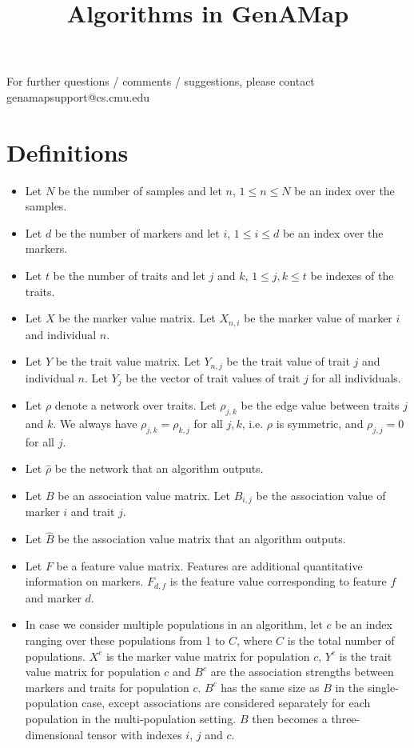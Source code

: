 \documentclass{article}
\title{Algorithms in GenAMap}
\author{}
\date{}
\begin{document}
\maketitle


\begin{raggedright}
For further questions / comments / suggestions, please contact genamapsupport@cs.cmu.edu

\end{raggedright}


\section{Definitions}

\begin{itemize}
\item Let $N$ be the number of samples and let $n$, $1 \le n \le N$ be an index over the samples.
\item Let $d$ be the number of markers and let $i$, $1 \le i \le d$ be an index over the markers.
\item Let $t$ be the number of traits and let $j$ and $k$, $1 \le j,k \le t$ be indexes of the traits.
\item Let $X$ be the marker value matrix. Let $X_{n,i}$ be the marker value of marker $i$ and individual $n$. 
\item Let $Y$ be the trait value matrix. Let $Y_{n,j}$ be the trait value of trait $j$ and individual $n$. Let $Y_j$ be the vector of trait values of trait $j$ for all individuals.
\item Let $\rho$ denote a network over traits. Let $\rho_{j,k}$ be the edge value between traits $j$ and $k$. We always have $\rho_{j,k} = \rho_{k,j}$ for all $j,k$, i.e. $\rho$ is symmetric, and $\rho_{j,j} = 0$ for all $j$.
\item Let $\hat{\rho}$ be the network that an algorithm outputs.
\item Let $B$ be an association value matrix. Let $B_{i,j}$ be the association value of marker $i$ and trait $j$. 
\item Let $\hat{B}$ be the association value matrix that an algorithm outputs.
\item Let $F$ be a feature value matrix. Features are additional quantitative information on markers. $F_{d,f}$ is the feature value corresponding to feature $f$ and marker $d$.
\item In case we consider multiple populations in an algorithm, let $c$ be an index ranging over these populations from 1 to $C$, where $C$ is the total number of populations. $X^c$ is the marker value matrix for population $c$, $Y^c$ is the trait value matrix for population $c$ and $B^c$ are the association strengths between markers and traits for population $c$. $B^c$ has the same size as $B$ in the single-population case, except associations are considered separately for each population in the multi-population setting. $B$ then becomes a three-dimensional tensor with indexes $i$, $j$ and $c$.

\end{itemize}
\end{document}

